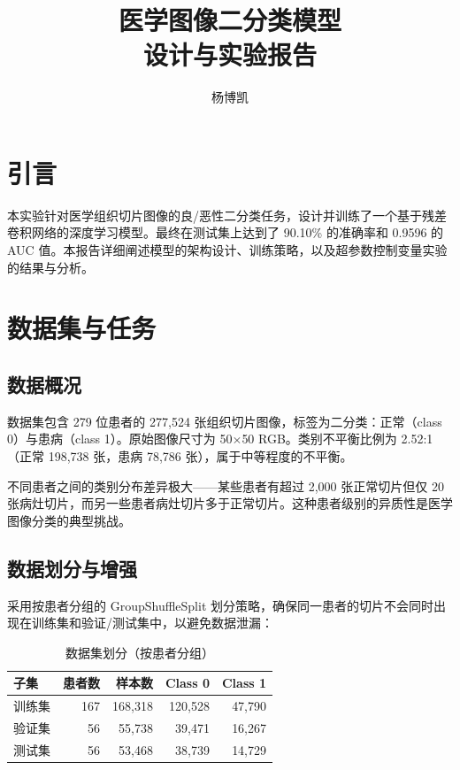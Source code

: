 \documentclass[12pt,a4paper]{ctexart}
\title{\textbf{医学图像二分类模型\\设计与实验报告}}
\author{杨博凯}
\date{}
\begin{document}
\maketitle

\section{引言}

本实验针对医学组织切片图像的良/恶性二分类任务，设计并训练了一个基于残差卷积网络的深度学习模型。最终在测试集上达到了 90.10\% 的准确率和 0.9596 的 AUC 值。本报告详细阐述模型的架构设计、训练策略，以及超参数控制变量实验的结果与分析。

\section{数据集与任务}

\subsection{数据概况}

数据集包含 279 位患者的 277,524 张组织切片图像，标签为二分类：正常（class 0）与患病（class 1）。原始图像尺寸为 50$\times$50 RGB。类别不平衡比例为 2.52:1（正常 198,738 张，患病 78,786 张），属于中等程度的不平衡。

不同患者之间的类别分布差异极大——某些患者有超过 2,000 张正常切片但仅 20 张病灶切片，而另一些患者病灶切片多于正常切片。这种患者级别的异质性是医学图像分类的典型挑战。

\subsection{数据划分与增强}

采用按患者分组的 GroupShuffleSplit 划分策略，确保同一患者的切片不会同时出现在训练集和验证/测试集中，以避免数据泄漏：

\begin{table}[H]
\centering
\caption{数据集划分（按患者分组）}
\begin{tabular}{lrrrr}
\toprule
子集 & 患者数 & 样本数 & Class 0 & Class 1 \\
\midrule
训练集 & 167 & 168,318 & 120,528 & 47,790 \\
验证集 & 56  & 55,738  & 39,471  & 16,267 \\
测试集 & 56  & 53,468  & 38,739  & 14,729 \\
\bottomrule
\end{tabular}
\end{table}
\end{document}
